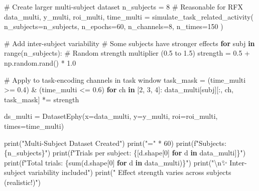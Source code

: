 \documentclass[
  11pt,
  letterpaper,
  oneside,
  openany]{book}
\newenvironment{Shaded}{\begin{snugshade}}{\end{snugshade}}
\newcommand{\BuiltInTok}[1]{\textcolor[rgb]{0.00,0.23,0.31}{#1}}
\newcommand{\CharTok}[1]{\textcolor[rgb]{0.13,0.47,0.30}{#1}}
\newcommand{\CommentTok}[1]{\textcolor[rgb]{0.37,0.37,0.37}{#1}}
\newcommand{\ControlFlowTok}[1]{\textcolor[rgb]{0.00,0.23,0.31}{\textbf{#1}}}
\newcommand{\DecValTok}[1]{\textcolor[rgb]{0.68,0.00,0.00}{#1}}
\newcommand{\FloatTok}[1]{\textcolor[rgb]{0.68,0.00,0.00}{#1}}
\newcommand{\KeywordTok}[1]{\textcolor[rgb]{0.00,0.23,0.31}{\textbf{#1}}}
\newcommand{\NormalTok}[1]{\textcolor[rgb]{0.00,0.23,0.31}{#1}}
\newcommand{\OperatorTok}[1]{\textcolor[rgb]{0.37,0.37,0.37}{#1}}
\newcommand{\SpecialCharTok}[1]{\textcolor[rgb]{0.37,0.37,0.37}{#1}}
\newcommand{\SpecialStringTok}[1]{\textcolor[rgb]{0.13,0.47,0.30}{#1}}
\newcommand{\StringTok}[1]{\textcolor[rgb]{0.13,0.47,0.30}{#1}}
\begin{document}
\begin{Shaded}
\begin{Highlighting}[]
\CommentTok{\# Create larger multi{-}subject dataset}
\NormalTok{n\_subjects }\OperatorTok{=} \DecValTok{8}  \CommentTok{\# Reasonable for RFX}
\NormalTok{data\_multi, y\_multi, roi\_multi, time\_multi }\OperatorTok{=}\NormalTok{ simulate\_task\_related\_activity(}
\NormalTok{    n\_subjects}\OperatorTok{=}\NormalTok{n\_subjects,}
\NormalTok{    n\_epochs}\OperatorTok{=}\DecValTok{60}\NormalTok{,}
\NormalTok{    n\_channels}\OperatorTok{=}\DecValTok{8}\NormalTok{,}
\NormalTok{    n\_times}\OperatorTok{=}\DecValTok{150}
\NormalTok{)}

\CommentTok{\# Add inter{-}subject variability}
\CommentTok{\# Some subjects have stronger effects}
\ControlFlowTok{for}\NormalTok{ subj }\KeywordTok{in} \BuiltInTok{range}\NormalTok{(n\_subjects):}
    \CommentTok{\# Random strength multiplier (0.5 to 1.5)}
\NormalTok{    strength }\OperatorTok{=} \FloatTok{0.5} \OperatorTok{+}\NormalTok{ np.random.rand() }\OperatorTok{*} \FloatTok{1.0}
    
    \CommentTok{\# Apply to task{-}encoding channels in task window}
\NormalTok{    task\_mask }\OperatorTok{=}\NormalTok{ (time\_multi }\OperatorTok{\textgreater{}=} \FloatTok{0.4}\NormalTok{) }\OperatorTok{\&}\NormalTok{ (time\_multi }\OperatorTok{\textless{}=} \FloatTok{0.6}\NormalTok{)}
    \ControlFlowTok{for}\NormalTok{ ch }\KeywordTok{in}\NormalTok{ [}\DecValTok{2}\NormalTok{, }\DecValTok{3}\NormalTok{, }\DecValTok{4}\NormalTok{]:}
\NormalTok{        data\_multi[subj][:, ch, task\_mask] }\OperatorTok{*=}\NormalTok{ strength}

\NormalTok{ds\_multi }\OperatorTok{=}\NormalTok{ DatasetEphy(x}\OperatorTok{=}\NormalTok{data\_multi, y}\OperatorTok{=}\NormalTok{y\_multi, roi}\OperatorTok{=}\NormalTok{roi\_multi, times}\OperatorTok{=}\NormalTok{time\_multi)}

\BuiltInTok{print}\NormalTok{(}\StringTok{"Multi{-}Subject Dataset Created"}\NormalTok{)}
\BuiltInTok{print}\NormalTok{(}\StringTok{"="} \OperatorTok{*} \DecValTok{60}\NormalTok{)}
\BuiltInTok{print}\NormalTok{(}\SpecialStringTok{f"Subjects: }\SpecialCharTok{\{}\NormalTok{n\_subjects}\SpecialCharTok{\}}\SpecialStringTok{"}\NormalTok{)}
\BuiltInTok{print}\NormalTok{(}\SpecialStringTok{f"Trials per subject: }\SpecialCharTok{\{}\NormalTok{[d.shape[}\DecValTok{0}\NormalTok{] }\ControlFlowTok{for}\NormalTok{ d }\KeywordTok{in}\NormalTok{ data\_multi]}\SpecialCharTok{\}}\SpecialStringTok{"}\NormalTok{)}
\BuiltInTok{print}\NormalTok{(}\SpecialStringTok{f"Total trials: }\SpecialCharTok{\{}\BuiltInTok{sum}\NormalTok{(d.shape[}\DecValTok{0}\NormalTok{] }\ControlFlowTok{for}\NormalTok{ d }\KeywordTok{in}\NormalTok{ data\_multi)}\SpecialCharTok{\}}\SpecialStringTok{"}\NormalTok{)}
\BuiltInTok{print}\NormalTok{(}\StringTok{"}\CharTok{\textbackslash{}n}\StringTok{✨ Inter{-}subject variability included"}\NormalTok{)}
\BuiltInTok{print}\NormalTok{(}\StringTok{"   Effect strength varies across subjects (realistic!)"}\NormalTok{)}
\end{Highlighting}
\end{Shaded}
\end{document}
